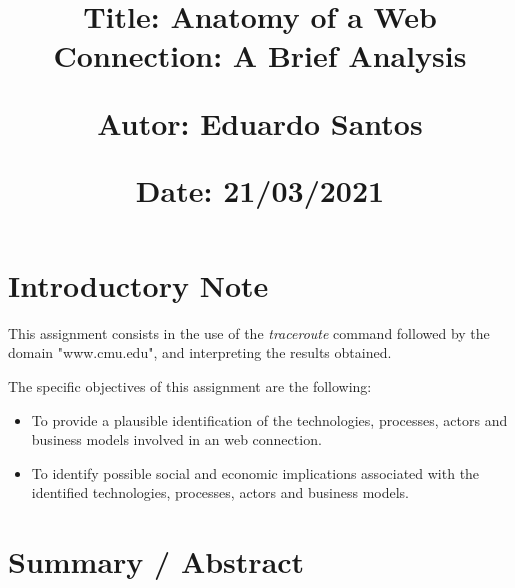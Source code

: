 \documentclass{article}
\newcommand\tab[1][1cm]{\hspace*{#1}}
\begin{document}
\title{\vspace{-0.9cm}
       \vspace{1cm}
       \normalsize
       \raggedright\textbf{Title: \hspace{1.5cm} Anatomy of a Web Connection: A Brief Analysis} \\ \vspace{0.4cm}
       \raggedright\textbf{Autor: \hspace{1.3cm} Eduardo Santos} \\ \vspace{0.4cm}
       \raggedright\textbf{Date: \hspace{1.45cm} 21/03/2021} \\}
\author{}
\date{}

\maketitle
\thispagestyle{fancy}


\vspace{-1.4cm}

\tableofcontents


\fontsize{10pt}{13pt}
\selectfont
\lsstyle


\newpage

\section{Introductory Note}

\tab This assignment consists in the use of the \textit{traceroute} command followed by the domain "www.cmu.edu", and interpreting the results obtained.  

\noindent The specific objectives of this assignment are the following:

\begin{itemize}
    \item To provide a plausible identification of the technologies, processes, actors and business models involved in an web connection.
    \item To identify possible social and economic implications associated with the identified technologies, processes, actors and business models.
\end{itemize}

\section{Summary / Abstract}
\end{document}
